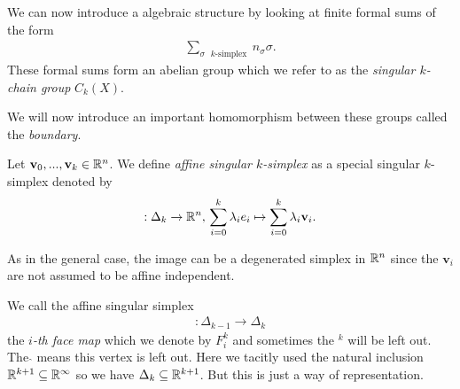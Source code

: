 \documentclass[../main.tex]{subfiles}
\begin{document}
We can now introduce a algebraic structure by looking at finite formal sums of the form 
\begin{align*}
    \sum_{\text{$\sigma$ $k$-simplex }} n_\sigma \sigma.
\end{align*}
These formal sums form an abelian group which we refer to as the 
\textit{singular $k$-chain group} $C_k(X)$. 

We will now introduce an important homomorphism between these groups called the \textit{boundary}.
\begin{definition}
    Let $\mathbf{v}_0, ... , \mathbf{v}_k \in \mathbb{R}^n$. 
    We define \textit{affine singular $k$-simplex} as a special singular $k$-simplex denoted by
    \begin{align*}
        [\mathbf{v}_0,...,\mathbf{v}_k]: \Delta_k \rightarrow \real^n, \, 
        \sum\limits_{i = 0}^k \lambda_i e_i \mapsto \sum\limits_{i = 0}^k \lambda_i \mathbf{v}_i.
    \end{align*}
\end{definition}
As in the general case, the image can be a degenerated simplex in $\mathbb{R}^n$ since the 
$\mathbf{v}_i$ are not assumed to be affine independent. 

We call the affine singular simplex 
\begin{align}
    [e_0,...,\hat{e}_i,...,e_k]: \Delta_{k-1} \rightarrow \Delta_k \label{eq:face_map}
\end{align}
the \textit{$i$-th face map} which we denote by $F^k_i$ and sometimes the $^k$ will be left out. 
The $\hat{ }$ means this vertex is left out. Here we tacitly used the 
natural inclusion $\mathbb{R}^{k+1} \subseteq \mathbb{R}^\infty$ so we have 
$\Delta_k \subseteq \mathbb{R}^{k+1}$. But this is just a way of representation.
\end{document}
